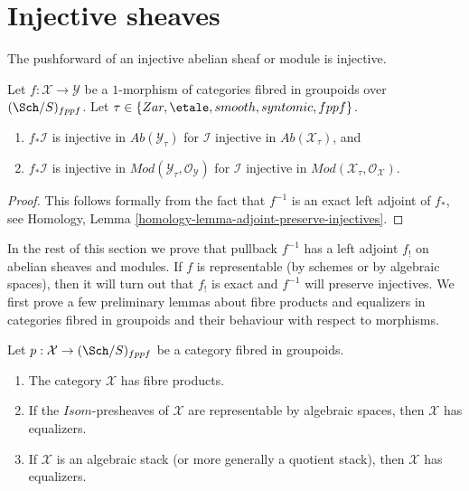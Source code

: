 \section{Injective sheaves}
\label{section-lower-shriek}

\noindent
The pushforward of an injective abelian sheaf or module is injective.

\begin{lemma}
\label{lemma-pushforward-injective}
Let $f : \mathcal{X} \to \mathcal{Y}$ be a $1$-morphism of categories
fibred in groupoids over $(\Sch/S)_{fppf}$. Let
$\tau \in \{Zar, \etale, smooth, syntomic, fppf\}$.
\begin{enumerate}
\item $f_*\mathcal{I}$ is injective in $\textit{Ab}(\mathcal{Y}_\tau)$
for $\mathcal{I}$ injective in $\textit{Ab}(\mathcal{X}_\tau)$, and
\item $f_*\mathcal{I}$ is injective in
$\textit{Mod}(\mathcal{Y}_\tau, \mathcal{O}_\mathcal{Y})$
for $\mathcal{I}$ injective in
$\textit{Mod}(\mathcal{X}_\tau, \mathcal{O}_\mathcal{X})$.
\end{enumerate}
\end{lemma}

\begin{proof}
This follows formally from the fact that $f^{-1}$ is an exact
left adjoint of $f_*$, see
Homology, Lemma \ref{homology-lemma-adjoint-preserve-injectives}.
\end{proof}

\noindent
In the rest of this section we prove that pullback $f^{-1}$ has a left
adjoint $f_!$ on abelian sheaves and modules. If $f$ is representable (by
schemes or by algebraic spaces), then it will turn out that $f_!$ is exact
and $f^{-1}$ will preserve injectives. We first prove a few
preliminary lemmas about fibre products and equalizers in categories
fibred in groupoids and their behaviour with respect to morphisms.

\begin{lemma}
\label{lemma-fibre-products}
Let $p : \mathcal{X} \to (\Sch/S)_{fppf}$
be a category fibred in groupoids.
\begin{enumerate}
\item The category $\mathcal{X}$ has fibre products.
\item If the $\mathit{Isom}$-presheaves of $\mathcal{X}$
are representable by algebraic spaces, then $\mathcal{X}$ has equalizers.
\item If $\mathcal{X}$ is an algebraic stack (or more generally
a quotient stack), then $\mathcal{X}$ has equalizers.
\end{enumerate}
\end{lemma}

